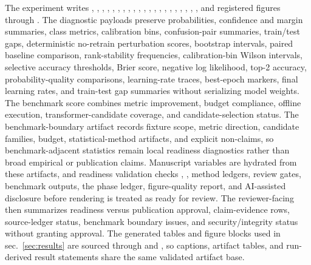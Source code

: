 \documentclass[
]{article}
\begin{document}
The experiment writes ,
,
,
,
,
,
,
,
,
,
,
,
,
,
,
,
,
,
,
,
, and registered
figures through . The
diagnostic payloads preserve probabilities, confidence and margin
summaries, class metrics, calibration bins, confusion-pair summaries,
train/test gaps, deterministic no-retrain perturbation scores, bootstrap
intervals, paired baseline comparison, rank-stability frequencies,
calibration-bin Wilson intervals, selective accuracy thresholds, Brier
score, negative log likelihood, top-2 accuracy, probability-quality
comparisons, learning-rate traces, best-epoch markers, final learning
rates, and train-test gap summaries without serializing model weights.
The benchmark score combines metric improvement, budget compliance,
offline execution, transformer-candidate coverage, and
candidate-selection status. The benchmark-boundary artifact records
fixture scope, metric direction, candidate families, budget,
statistical-method artifacts, and explicit non-claims, so
benchmark-adjacent statistics remain local readiness diagnostics rather
than broad empirical or publication claims. Manuscript variables are
hydrated from these artifacts, and readiness validation checks
,
, method ledgers, review
gates, benchmark outputs, the phase ledger, figure-quality report, and
AI-assisted disclosure before rendering is treated as ready for review.
The reviewer-facing
 then
summarizes readiness versus publication approval, claim-evidence rows,
source-ledger status, benchmark boundary issues, and security/integrity
status without granting approval. The generated tables and figure blocks
used in sec.~\ref{sec:results} are sourced through
 and
, so captions,
artifact tables, and run-derived result statements share the same
validated artifact base.
\end{document}
